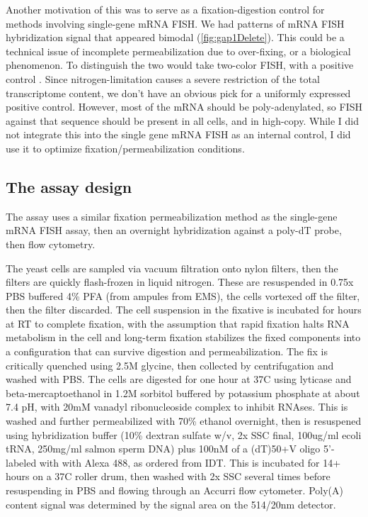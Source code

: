 Another motivation of this was to serve as a fixation-digestion
control for methods involving single-gene mRNA FISH.
We had patterns of mRNA FISH hybridization signal that appeared
bimodal (\autoref{fig:gap1Delete}).
This could be a technical issue of incomplete permeabilization due to
over-fixing, or a biological phenomenon.
To distinguish the two would take two-color FISH, with a positive
control \parencite{andersen2014genetic}.
Since nitrogen-limitation causes a severe restriction of the total
transcriptome content, we don't have an obvious pick for a uniformly
expressed positive control. 
However, most of the mRNA should be poly-adenylated, so FISH against
that sequence should be present in all cells, and in high-copy.
While I did not integrate this into the single gene mRNA FISH as an
internal control, I did use it to optimize fixation/permeabilization 
conditions.

%
%
%
\subsection{The assay design}
%
%
%

The assay uses a similar fixation permeabilization method as the
single-gene mRNA FISH assay, then an overnight hybridization 
against a poly-dT probe, then flow cytometry.

The yeast cells are sampled via vacuum filtration onto nylon
filters, then the filters are quickly flash-frozen in liquid nitrogen.
These are resuspended in 0.75x PBS buffered 4\% PFA (from ampules from
EMS), the cells vortexed off the filter, then the filter discarded.
The cell suspension in the fixative is incubated for hours at RT to
complete fixation, with the assumption that rapid fixation halts
RNA metabolism in the cell and long-term fixation stabilizes the fixed
components into a configuration that can survive digestion and 
permeabilization. The fix is critically quenched using 2.5M glycine,
then collected by centrifugation and washed with PBS. The cells are
digested for one hour at 37C using lyticase and beta-mercaptoethanol
in 1.2M sorbitol buffered
by potassium phosphate at about 7.4 pH, with 20mM vanadyl
ribonucleoside complex to inhibit RNAses. 
This is washed and further permeabilized with 70\% ethanol overnight,
then is resuspened using hybridization buffer
(10\% dextran sulfate w/v, 2x SSC final, 100ug/ml ecoli tRNA, 
250mg/ml salmon sperm DNA) plus 100nM of a (dT)50+V oligo 5'-labeled
with with Alexa 488, as ordered from IDT. 
This is incubated for 14+ hours on a 37C roller drum, then washed with
2x SSC several times before resuspending in PBS and flowing through an
Accurri flow cytometer.
Poly(A) content signal was determined by the signal area on the
514/20nm detector.

